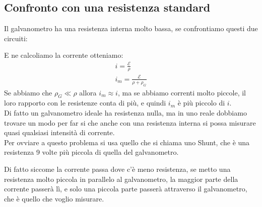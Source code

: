 \documentclass[a4paper, oneside]{article}
\begin{document}
\subsection{Confronto con una resistenza standard}
Il galvanometro ha una resistenza interna molto bassa, se confrontiamo questi due circuiti:
\begin{center}
\end{center}
E ne calcoliamo la corrente otteniamo:
\begin{gather*}
    i = \frac{\mathcal{E}}{\rho}\\
    i_m = \frac{\mathcal{E}}{\rho+ \rho_G}
\end{gather*}
Se abbiamo che $\rho_G \ll \rho$ allora $i_m \approx i$, ma se abbiamo correnti molto piccole, il loro rapporto con le resistenze conta di più, e quindi $i_m$ è più piccolo di $i$.\\
Di fatto un galvanometro ideale ha resistenza nulla, ma in uno reale dobbiamo trovare un modo per far si che anche con una resistenza interna si possa misurare quasi qualsiasi intensità di corrente.\\
Per ovviare a questo problema si usa quello che si chiama uno Shunt, che è una resistenza 9 volte più piccola di quella del galvanometro.
\begin{center}
\end{center}
Di fatto siccome la corrente passa dove c'è meno resistenza, se metto una resistenza molto piccola in parallelo al galvanometro, la maggior parte della corrente passerà lì, e solo una piccola parte passerà attraverso il galvanometro, che è quello che voglio misurare.\\
\end{document}
